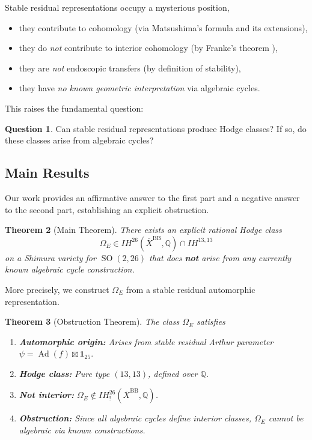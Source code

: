 \documentclass[12pt]{amsart}
\newtheorem{theorem}{Theorem}[section]
\theoremstyle{definition}
\newtheorem{question}[theorem]{Question}
\DeclareMathOperator\SO{SO}
\DeclareMathOperator\Ad{Ad}
\newcommand{\Q}{\mathbb{Q}}
\newcommand{\IH}{\mathit{IH}}
\begin{document}
Stable residual representations occupy a mysterious position,
\begin{itemize}
\item they contribute to cohomology (via Matsushima's formula and its extensions),
\item they do \textit{not} contribute to interior cohomology (by Franke's theorem \cite{Franke}),
\item they are \textit{not} endoscopic transfers (by definition of stability),
\item they have \textit{no known geometric interpretation} via algebraic cycles.
\end{itemize}

This raises the fundamental question:

\begin{question}
Can stable residual representations produce Hodge classes? If so, do these classes arise from algebraic cycles?
\end{question}

\subsection{Main Results}

Our work provides an affirmative answer to the first part and a negative answer to the second part, establishing an explicit obstruction.

\begin{theorem}[Main Theorem]\label{thm:main}
There exists an explicit rational Hodge class
$$\Omega_E \in \IH^{26}(\overline{X}^{\mathrm{BB}}, \Q) \cap \IH^{13,13}$$
on a Shimura variety for $\SO(2,26)$ that does \textbf{not} arise from any currently known algebraic cycle construction.
\end{theorem}

More precisely, we construct $\Omega_E$ from a stable residual automorphic representation.

\begin{theorem}[Obstruction Theorem]\label{thm:obstruction}
The class $\Omega_E$ satisfies
\begin{enumerate}
\item \textbf{Automorphic origin:} Arises from stable residual Arthur parameter $\psi = \Ad(f) \boxtimes \mathbf{1}_{25}.$
\item \textbf{Hodge class:} Pure type $(13,13)$, defined over $\Q$.
\item \textbf{Not interior:} $\Omega_E \notin \IH^{26}_!(\overline{X}^{\mathrm{BB}}, \Q)$.
\item \textbf{Obstruction:} Since all algebraic cycles define interior classes, $\Omega_E$ cannot be algebraic via known constructions.
\end{enumerate}
\end{theorem}
\end{document}
